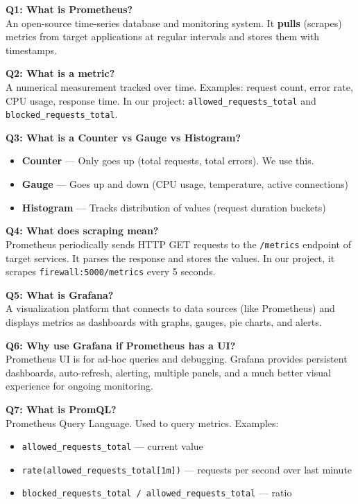 \documentclass[12pt,a4paper]{article}
\begin{document}
\textbf{Q1: What is Prometheus?}\\
An open-source time-series database and monitoring system. It \textbf{pulls} (scrapes) metrics from target applications at regular intervals and stores them with timestamps.

\textbf{Q2: What is a metric?}\\
A numerical measurement tracked over time. Examples: request count, error rate, CPU usage, response time. In our project: \texttt{allowed\_requests\_total} and \texttt{blocked\_requests\_total}.

\textbf{Q3: What is a Counter vs Gauge vs Histogram?}
\begin{itemize}[noitemsep]
    \item \textbf{Counter} --- Only goes up (total requests, total errors). We use this.
    \item \textbf{Gauge} --- Goes up and down (CPU usage, temperature, active connections)
    \item \textbf{Histogram} --- Tracks distribution of values (request duration buckets)
\end{itemize}

\textbf{Q4: What does scraping mean?}\\
Prometheus periodically sends HTTP GET requests to the \texttt{/metrics} endpoint of target services. It parses the response and stores the values. In our project, it scrapes \texttt{firewall:5000/metrics} every 5 seconds.

\textbf{Q5: What is Grafana?}\\
A visualization platform that connects to data sources (like Prometheus) and displays metrics as dashboards with graphs, gauges, pie charts, and alerts.

\textbf{Q6: Why use Grafana if Prometheus has a UI?}\\
Prometheus UI is for ad-hoc queries and debugging. Grafana provides persistent dashboards, auto-refresh, alerting, multiple panels, and a much better visual experience for ongoing monitoring.

\textbf{Q7: What is PromQL?}\\
Prometheus Query Language. Used to query metrics. Examples:
\begin{itemize}[noitemsep]
    \item \texttt{allowed\_requests\_total} --- current value
    \item \texttt{rate(allowed\_requests\_total[1m])} --- requests per second over last minute
    \item \texttt{blocked\_requests\_total / allowed\_requests\_total} --- ratio
\end{itemize}
\end{document}
